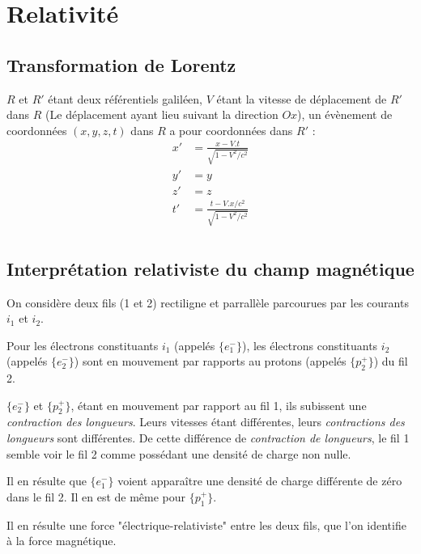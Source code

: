 
\chapter{Relativité}

\section{Transformation de Lorentz}
%
$R$ et $R'$ étant deux référentiels galiléen, $V$ étant la vitesse de déplacement de $R'$ dans $R$ (Le déplacement ayant lieu suivant la direction $Ox$), un évènement de coordonnées $(x,y,z,t)$ dans $R$ a pour coordonnées dans $R'$ :
\begin{align*}
x' & = \frac{x - V.t}{\sqrt{1-V^2/c^2}} \\
y' & = y \\
z' & = z \\
t' & = \frac{t - V.x/c^2}{\sqrt{1-V^2/c^2}} \\
\end{align*}

\section{Interprétation relativiste du champ magnétique}
On considère deux fils (1 et 2) rectiligne et parrallèle parcourues par les courants $i_1$ et $i_2$.

Pour les électrons constituants $i_1$ (appelés $\{e^-_1\}$), les électrons constituants $i_2$ (appelés $\{e^-_2\}$) sont en mouvement par rapports au protons (appelés $\{p^+_2\}$) du fil 2.

$\{e^-_2\}$ et $\{p^+_2\}$, étant en mouvement par rapport au fil 1, ils subissent une {\it contraction des longueurs}. Leurs vitesses étant différentes, leurs {\it contractions des longueurs} sont différentes. De cette différence de {\it contraction de longueurs}, le fil 1 semble voir le fil 2 comme possédant une densité de charge non nulle.

Il en résulte que $\{e^-_1\}$ voient apparaître une densité de charge différente de zéro dans le fil 2. Il en est de même pour $\{p^+_1\}$.

Il en résulte une force "électrique-relativiste" entre les deux fils, que l'on identifie à la force magnétique.
%
